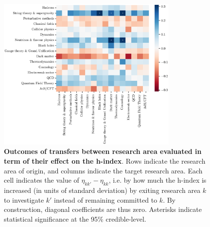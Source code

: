\documentclass{article}
\begin{document}
\begin{figure}
    \centering
    \includegraphics[width=0.8\textwidth]{plots/outcomes_rho.eps}
    \caption{\textbf{Outcomes of transfers between research area evaluated in term of their effect on the h-index}. Rows indicate the research area of origin, and columns indicate the target research area. Each cell indicates the value of $\eta_{kk'}-\eta_{kk}$, i.e. by how much the h-index is increased (in units of standard deviation) by exiting research area $k$ to investigate $k'$ instead of remaining committed to $k$. By construction, diagonal coefficients are thus zero. Asterisks indicate statistical significance at the 95\% credible-level. }
    \label{fig:outcomes_rho}
\end{figure}


\end{document}
